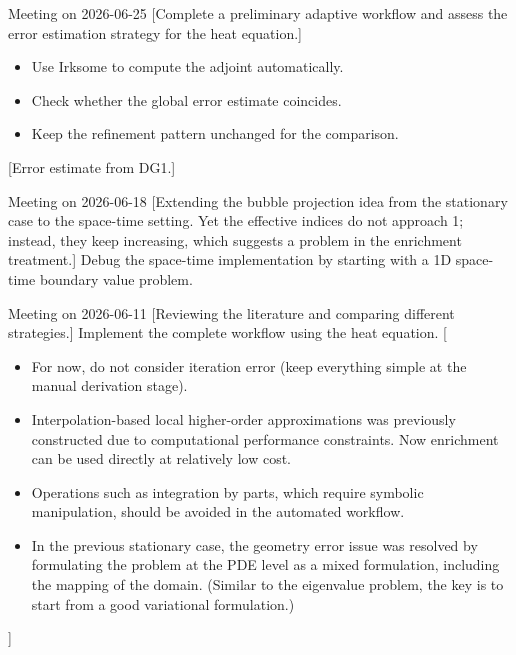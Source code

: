 \documentclass[11pt,a4paper]{article}
\begin{document}
\meet
{Meeting on 2026-06-25}
[Complete a preliminary adaptive workflow and assess the error estimation strategy for the heat equation.]
{\begin{itemize}
    \item Use Irksome to compute the adjoint automatically.
    \item Check whether the global error estimate coincides.
    \item Keep the refinement pattern unchanged for the comparison.
\end{itemize}
}
[Error estimate from DG1.]
\vspace{1.5em}


\meet
{Meeting on 2026-06-18}
[Extending the bubble projection idea from the stationary case to the space-time setting. Yet the effective indices do not approach 1; instead, they keep increasing, which suggests a problem in the enrichment treatment.]
{Debug the space-time implementation by starting with a 1D space-time boundary value problem.}
\vspace{1.5em}



\meet
{Meeting on 2026-06-11}
[Reviewing the literature and comparing different strategies.]
{Implement the complete workflow using the heat equation.}
[\begin{itemize}
    \item For now, do not consider iteration error (keep everything simple at the manual derivation stage).
    \item Interpolation-based local higher-order approximations was previously constructed due to computational performance constraints. Now enrichment can be used directly at relatively low cost.
    \item Operations such as integration by parts, which require symbolic manipulation, should be avoided in the automated workflow.
    \item[*] In the previous stationary case, the geometry error issue was resolved by formulating the problem at the PDE level as a mixed formulation, including the mapping of the domain. (Similar to the eigenvalue problem, the key is to start from a good variational formulation.)
\end{itemize}]
\vspace{1.5em}
\end{document}
